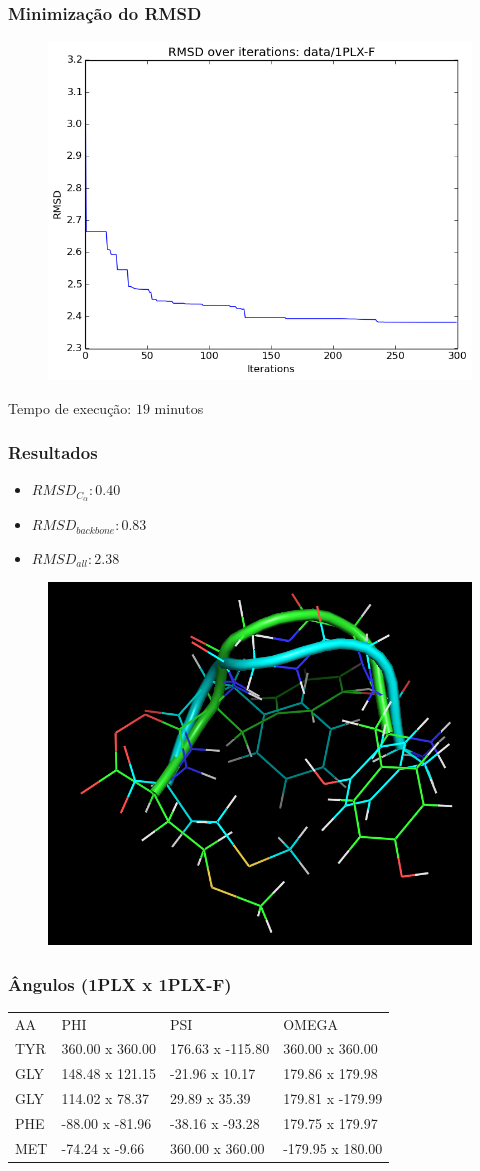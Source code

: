 \documentclass{beamer}
\begin{document}
\begin{frame}
\frametitle{Minimização do RMSD}
\begin{figure}
\includegraphics[width=0.7\linewidth]{1PLX-F_rmsd.png}
\end{figure}
Tempo de execução: $19$ minutos
\end{frame}

\begin{frame}
\frametitle{Resultados}
\begin{itemize}
  \item $RMSD_{C_\alpha}: 0.40$
  \item $RMSD_{backbone}: 0.83$
  \item $RMSD_{all}: 2.38$ 
\end{itemize}
\begin{figure}
\includegraphics[width=0.5\linewidth]{1PLX-F.png}
\end{figure}
\end{frame}

\begin{frame}
\frametitle{Ângulos (1PLX x 1PLX-F)}
\begin{table}[]
\centering
\label{my-label}
\begin{tabular}{llll}
AA & PHI             &  PSI              &  OMEGA             \\
TYR         & 360.00 x 360.00 &  176.63 x -115.80 &  360.00 x  360.00  \\
GLY         & 148.48 x 121.15 &  -21.96 x   10.17 &  179.86 x  179.98  \\
GLY         & 114.02 x  78.37 &   29.89 x   35.39 &  179.81 x -179.99  \\
PHE         & -88.00 x -81.96 &  -38.16 x  -93.28 &  179.75 x  179.97  \\
MET         & -74.24 x  -9.66 &  360.00 x  360.00 & -179.95 x  180.00
\end{tabular}
\end{table}
\end{frame}
\end{document}
